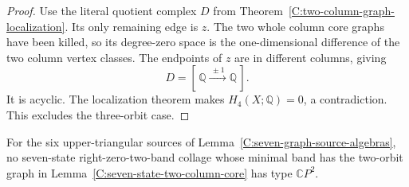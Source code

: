 \begin{proof}
Use the literal quotient complex $D$ from
Theorem~\ref{C:two-column-graph-localization}.
Its only remaining edge is $z$.  The two whole column
core graphs have been killed, so its degree-zero space
is the one-dimensional difference of the two column
vertex classes.  The endpoints of $z$ are in different
columns, giving
\[
 D=[\,\mathbb Q\xrightarrow{\ \pm1\ }\mathbb Q\,].
\]
It is acyclic.  The localization theorem makes
$H_4(X;\mathbb Q)=0$, a contradiction.  This excludes
the three-orbit case.
\end{proof}

\begin{lemma}
\label{C:seven-state-triangular-graph-control}
For the six upper-triangular sources of
Lemma~\ref{C:seven-graph-source-algebras}, no seven-state
right-zero-two-band collage whose minimal band has the
two-orbit graph in Lemma~\ref{C:seven-state-two-column-core}
has type $\mathbb CP^2$.
\end{lemma}
